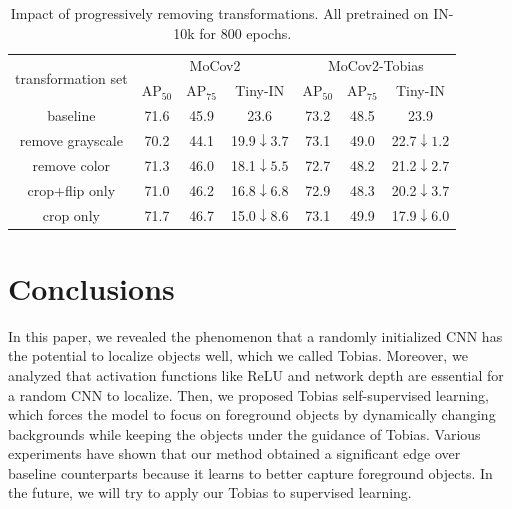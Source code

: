 \documentclass[letterpaper]{article}
\def\pt{\phantom{0}}
\begin{document}
\begin{table}
	\caption{Impact of progressively removing transformations. All pretrained on IN-10k for 800 epochs.}
	\label{tab:transformation}
	\centering
	\small
	\setlength{\tabcolsep}{2pt}
	\renewcommand{\arraystretch}{0.95}
	\renewcommand{\multirowsetup}{\centering}
	\begin{adjustbox}{width=0.27\columnwidth}
\begin{tabular}{c|ccc|ccc}
		\hline
		\multirow{2}{*}{transformation set}         &           \multicolumn{3}{c|}{MoCov2}    &\multicolumn{3}{c}{MoCov2-Tobias}         \\
		\cline{2-7}
		& $\text{AP}_{50}$ &  $\text{AP}_{75}$ &Tiny-IN & $\text{AP}_{50}$ & $\text{AP}_{75}$ &Tiny-IN\\
		\hline
		baseline	 &     71.6          &   45.9      &   23.6\tiny{\pt\pt\pt\pt\pt} &73.2&48.5&23.9\tiny{\pt\pt\pt\pt\pt} \\
		remove grayscale	 &   70.2          &   44.1    &      19.9\tiny$\downarrow3.7$&73.1&49.0&22.7\tiny$\downarrow1.2$\\
		remove color 	 &   71.3            &  46.0       &18.1\tiny$\downarrow5.5$   &72.7&48.2&21.2\tiny$\downarrow2.7$ \\
		crop+flip only &    71.0   &46.2 & 16.8\tiny$\downarrow6.8$&72.9&48.3& 20.2\tiny$\downarrow3.7$\\
		crop only &71.7&46.7&15.0\tiny$\downarrow8.6$&73.1&49.9&17.9\tiny$\downarrow6.0$\\
		\hline
	\end{tabular}
\end{adjustbox}
\end{table}

\section{Conclusions}

In this paper, we revealed the phenomenon that a randomly initialized CNN has the potential to localize objects well, which we called Tobias. Moreover, we analyzed that activation functions like ReLU and network depth are essential for a random CNN to localize. Then, we proposed Tobias self-supervised learning, which forces the model to focus on foreground objects by dynamically changing backgrounds while keeping the objects under the guidance of Tobias. Various experiments have shown that our method obtained a significant edge over baseline counterparts because it learns to better capture foreground objects. In the future, we will try to apply our Tobias to supervised learning.
\end{document}
